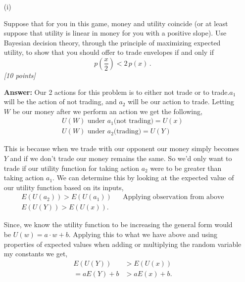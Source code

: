 \documentclass[12pt]{article}
\begin{document}
\begin{itemize}

\item[(i)] %

Suppose that for you in this game, money and
utility coincide (or at least suppose that utility is linear in money for
you with a positive slope). Use Bayesian decision theory, through the
principle of maximizing expected utility, to show that you should offer to
trade envelopes if and only if
\begin{equation} \label{e:meu-1}
p \! \left( \frac{ x }{ 2 } \right) < 2 \, p ( x ) \, . 
\end{equation} 
\textit{[10 points]}

{\bf Answer:}
Our 2 actions for this problem is to either not trade or to trade.$a_1$ will be the action of not trading, and $a_2$ will be our action to trade. Letting $W$ be our money after we perform an action we get the following,
\begin{align*}
    U(W) \text{ under } a_1 \text{(not trading)} = U(x) \\
    U(W) \text{ under } a_2 \text{(trading)} = U(Y)
\end{align*}

This is because when we trade with our opponent our money simply becomes $Y$ and if we don't trade our money remains the same. So we'd only want to trade if our utility function for taking action $a_2$ were to be greater than taking action $a_1$. We can determine this by looking at the expected value of our utility function based on its inputs,
\begin{align*}
    E(U(a_2)) > E(U(a_1)) && \text{Applying observation from above} \\
    E(U(Y)) > E(U(x)).
\end{align*}

Since, we know the utility function to be increasing the general form would be $U(w) = a\cdot w + b $. Applying this to what we have above and using properties of expected values when adding or multiplying the random variable my constants we get,
\begin{align*}
    E(U(Y)) &> E(U(x)) \\
    = aE(Y) + b &> aE(x) + b.
\end{align*}


\end{itemize}
\end{document}
